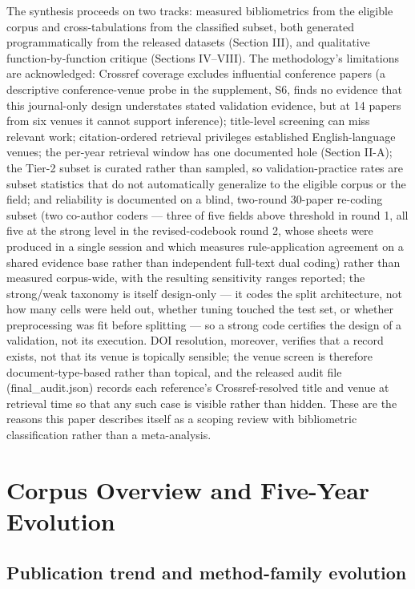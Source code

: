 \documentclass[journal]{IEEEtran}
\begin{document}
The synthesis proceeds on two tracks: measured bibliometrics from the eligible corpus and cross-tabulations from the classified subset, both generated programmatically from the released datasets (Section III), and qualitative function-by-function critique (Sections IV--VIII). The methodology's limitations are acknowledged: Crossref coverage excludes influential conference papers (a descriptive conference-venue probe in the supplement, S6, finds no evidence that this journal-only design understates stated validation evidence, but at 14 papers from six venues it cannot support inference); title-level screening can miss relevant work; citation-ordered retrieval privileges established English-language venues; the per-year retrieval window has one documented hole (Section II-A); the Tier-2 subset is curated rather than sampled, so validation-practice rates are subset statistics that do not automatically generalize to the eligible corpus or the field; and reliability is documented on a blind, two-round 30-paper re-coding subset (two co-author coders --- three of five fields above threshold in round 1, all five at the strong level in the revised-codebook round 2, whose sheets were produced in a single session and which measures rule-application agreement on a shared evidence base rather than independent full-text dual coding) rather than measured corpus-wide, with the resulting sensitivity ranges reported; the strong/weak taxonomy is itself design-only --- it codes the split architecture, not how many cells were held out, whether tuning touched the test set, or whether preprocessing was fit before splitting --- so a strong code certifies the design of a validation, not its execution. DOI resolution, moreover, verifies that a record exists, not that its venue is topically sensible; the venue screen is therefore document-type-based rather than topical, and the released audit file (final\_audit.json) records each reference's Crossref-resolved title and venue at retrieval time so that any such case is visible rather than hidden. These are the reasons this paper describes itself as a scoping review with bibliometric classification rather than a meta-analysis.

\section{Corpus Overview and Five-Year Evolution}

\subsection{Publication trend and method-family evolution}
\end{document}
